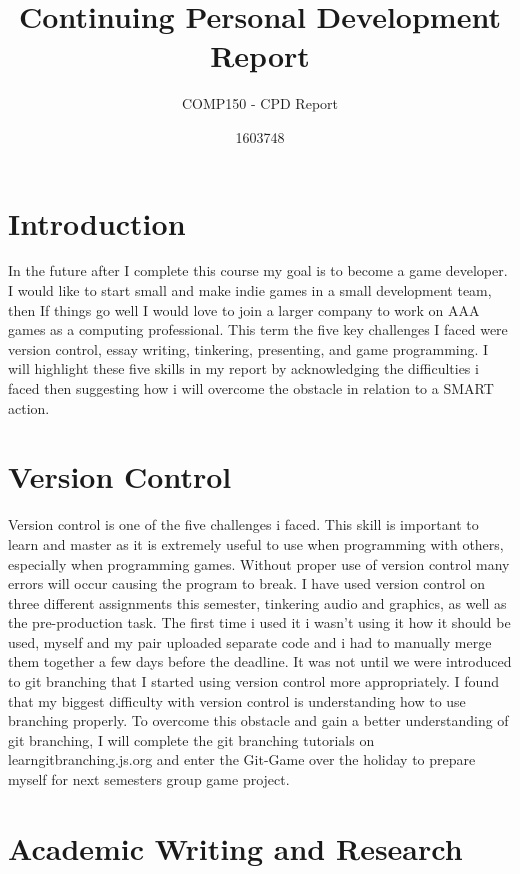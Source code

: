 \documentclass{scrartcl}
\title{Continuing Personal Development Report}
\subtitle{COMP150 - CPD Report}
\author{1603748}
\begin{document}
\maketitle

\section*{Introduction}

In the future after I complete this course my goal is to become a game developer. I would like to start small and make indie games in a small development team, then If things go well I would love to join a larger company to work on AAA games as a computing professional. This term the five key challenges I faced were version control, essay writing, tinkering, presenting, and game programming. I will highlight these five skills in my report by acknowledging the difficulties i faced then suggesting how i will overcome the obstacle in relation to a SMART action. 

\section{Version Control}

Version control is one of the five challenges i faced. This skill is important to learn and master as it is extremely useful to use when programming with others, especially when programming games. Without proper use of version control many errors will occur causing the program to break. I have used version control on three different assignments this semester, tinkering audio and graphics, as well as the pre-production task. The first time i used it i wasn't using it how it should be used, myself and my pair uploaded separate code and i had to manually merge them together a few days before the deadline. It was not until we were introduced to git branching that I started using version control more appropriately. I found that my biggest difficulty with version control is understanding how to use branching properly. To overcome this obstacle and gain a better understanding of git branching, I will complete the git branching tutorials on learngitbranching.js.org and enter the Git-Game over the holiday to prepare myself for next semesters group game project.

\section{Academic Writing and Research}
\end{document}
